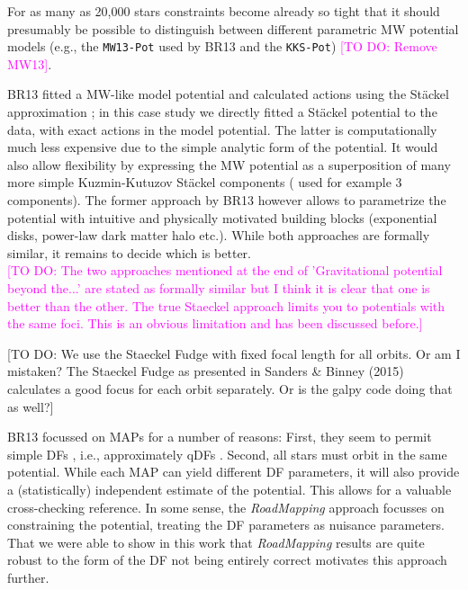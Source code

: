\documentclass[iop,revtex4]{emulateapj}
\newcommand{\MAP}{MAP}
\newcommand{\MAPs}{MAPs}
\newcommand{\RM}{{\sl RoadMapping}}
\newcommand{\Jo}[1]{\textcolor{YellowOrange}{#1}}
\newcommand{\Wilma}[1]{\textcolor{Magenta}{#1}}
\begin{document}
For as many as 20,000 stars constraints become already so tight that it should presumably be possible to distinguish between different parametric MW potential models (e.g., the \texttt{MW13-Pot} used by BR13 and the \texttt{KKS-Pot}) \Wilma{[TO DO: Remove MW13]}.

BR13 fitted a MW-like model potential and calculated actions using the St\"{a}ckel approximation \citep{2012MNRAS.426.1324B}; in this case study we directly fitted a St\"{a}ckel potential to the data, with exact actions in the model potential. The latter is computationally much less expensive due to the simple analytic form of the potential. It would also allow flexibility by expressing the MW potential as a superposition of many more simple Kuzmin-Kutuzov St\"{a}ckel components (\citet{2003MNRAS.340..752F} used for example 3 components). The former approach by BR13 however allows to parametrize the potential with intuitive and physically motivated building blocks (exponential disks, power-law dark matter halo etc.). While both approaches are formally similar, it remains to decide which is better.\\

\Wilma{[TO DO: The two approaches mentioned at the end of 'Gravitational potential beyond the...' are stated as formally similar but I think it is clear that one is better than the other. The true Staeckel approach limits you to potentials with the same foci. This is an obvious limitation and has been discussed before.]}

\Jo{[TO DO: We use the Staeckel Fudge with fixed focal length for all orbits. Or am I mistaken? The Staeckel Fudge as presented in Sanders \& Binney (2015) calculates a good focus for each orbit separately. Or is the galpy code doing that as well?]}

 BR13 focussed on \MAPs{} for a number of reasons: First, they seem to permit simple DFs \citep{2012ApJ...751..131B,2012ApJ...755..115B,2012ApJ...753..148B}, i.e., approximately qDFs \citep{2013MNRAS.434..652T}. Second, all stars must orbit in the same potential. While each \MAP{} can yield different DF parameters, it will also provide a (statistically) independent estimate of the potential. This allows for a valuable cross-checking reference. In some sense, the \RM{} approach focusses on constraining the potential, treating the DF parameters as nuisance parameters. That we were able to show in this work that \RM{} results are quite robust to the form of the DF not being entirely correct motivates this approach further. 
\end{document}
